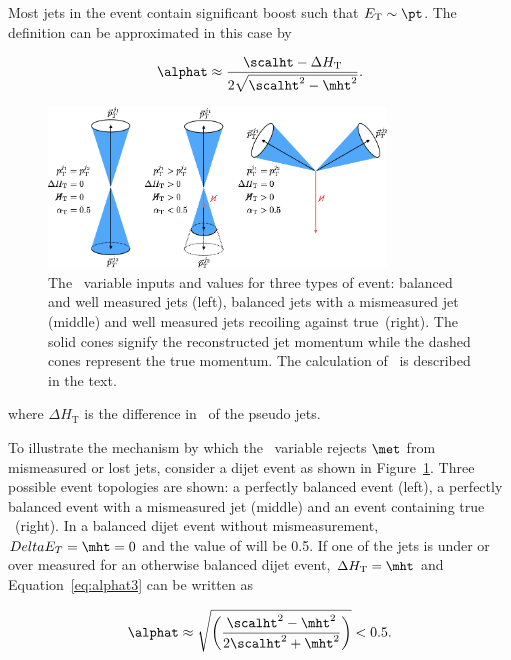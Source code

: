 Most jets in the event contain significant boost such that $E_{\textrm{T}} \sim \pt$. The \alphat 
definition can be approximated in this case by

\begin{equation}
  \label{eq:alphat3}
   \alphat \approx \frac{\scalht - \Delta H_{\textrm{T}}}{2\sqrt{\scalht^2 - \mht^2}}.
\end{equation}

\begin{figure}
\centering
    \includegraphics[width=0.8\textwidth]{./Figures/alphat/alphat_cartoon}
  \caption{\label{fig:alphat_cartoon} The \alphat~variable inputs and values for three types of event: balanced and well measured jets (left), balanced jets with
  a mismeasured jet (middle) and well measured jets recoiling against true~\met (right). The solid cones signify the reconstructed jet momentum while the 
  dashed cones represent the true momentum. The calculation of \alphat~is described in the text.} 
\end{figure}
where $\Delta H_{\textrm{T}}$ is the difference in \pt~of the pseudo jets.

To illustrate the mechanism by which the \alphat~variable rejects $\met$ from mismeasured or lost jets,
consider a dijet event as shown in Figure~\ref{fig:alphat_cartoon}. Three possible event topologies are shown: 
a perfectly balanced event (left), a perfectly balanced event with a mismeasured jet (middle) and an event containing true \met~(right).
In a balanced dijet event without mismeasurement, $Delta E_T = \mht = 0$ and the 
value of \alphat will be 0.5. If one of the jets is under or over measured for an otherwise balanced dijet
event, $\Delta H_{\textrm{T}} = \mht$ and Equation~\ref{eq:alphat3} can be written as 

\begin{equation}
  \label{eq:alphat4}
   \alphat \approx \sqrt{\left(\frac{\scalht^2 - \mht^2}{2\scalht^2 + \mht^2}\right)} < 0.5.
\end{equation}

